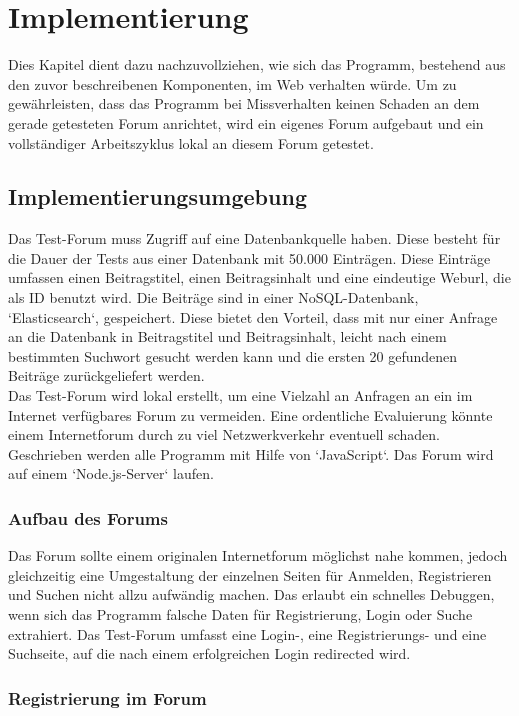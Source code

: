 \section{Implementierung}
Dies Kapitel dient dazu nachzuvollziehen, wie sich das Programm, bestehend aus den zuvor beschreibenen Komponenten, im Web verhalten würde. Um zu gewährleisten, dass das Programm bei Missverhalten keinen Schaden an dem gerade getesteten Forum anrichtet, wird ein eigenes Forum aufgebaut und ein vollständiger Arbeitszyklus lokal an diesem Forum getestet.

\subsection{Implementierungsumgebung}
Das Test-Forum muss Zugriff auf eine Datenbankquelle haben. Diese besteht für die Dauer der Tests aus einer Datenbank mit 50.000 Einträgen. Diese Einträge umfassen einen Beitragstitel, einen Beitragsinhalt und eine eindeutige Weburl, die als ID benutzt wird. Die Beiträge sind in einer NoSQL-Datenbank, `Elasticsearch`, gespeichert. Diese bietet den Vorteil, dass mit nur einer Anfrage an die Datenbank in Beitragstitel und Beitragsinhalt, leicht nach einem bestimmten Suchwort gesucht werden kann und die ersten 20 gefundenen Beiträge zurückgeliefert werden.\\
Das Test-Forum wird lokal erstellt, um eine Vielzahl an Anfragen an ein im Internet verfügbares Forum zu vermeiden. Eine ordentliche Evaluierung könnte einem Internetforum durch zu viel Netzwerkverkehr eventuell schaden.\\
Geschrieben werden alle Programm mit Hilfe von `JavaScript`. Das Forum wird auf einem `Node.js-Server` laufen. 

\subsubsection{Aufbau des Forums}
Das Forum sollte einem originalen Internetforum möglichst nahe kommen, jedoch gleichzeitig eine Umgestaltung der einzelnen Seiten für Anmelden, Registrieren und Suchen nicht allzu aufwändig machen. Das erlaubt ein schnelles Debuggen, wenn sich das Programm falsche Daten für Registrierung, Login oder Suche extrahiert. Das Test-Forum umfasst eine Login-, eine Registrierungs- und eine Suchseite, auf die nach einem erfolgreichen Login redirected wird.

\subsubsection{Registrierung im Forum}

